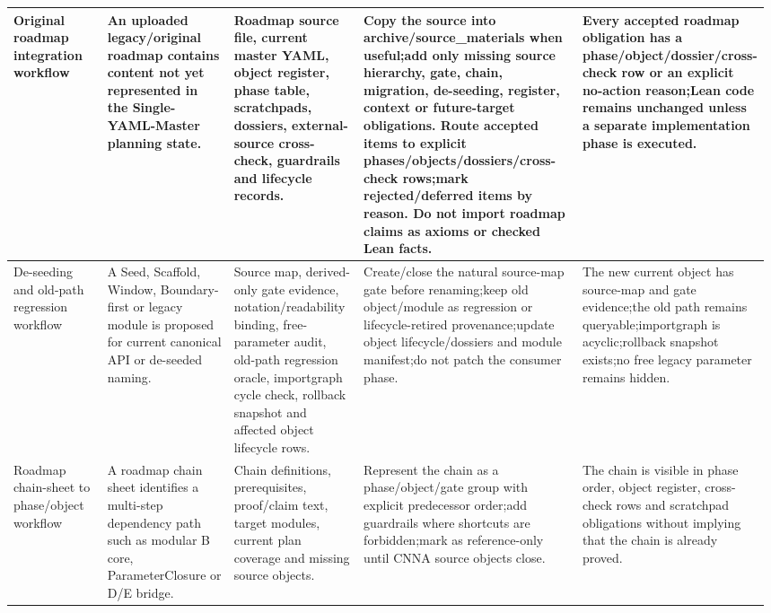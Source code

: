 \begin{longtable}{L{0.14\linewidth} L{0.19\linewidth} L{0.18\linewidth} L{0.31\linewidth} L{0.16\linewidth}}
Original roadmap integration workflow & An uploaded legacy/\allowbreak{}original roadmap contains content not yet represented in the Single-YAML-Master planning state. & Roadmap source file, current master YAML, object register, phase table, scratchpads, dossiers, external-source cross-check, guardrails and lifecycle records. & Copy the source into archive/\allowbreak{}source\_materials when useful;\newline add only missing source hierarchy, gate, chain, migration, de-seeding, register, context or future-target obligations. Route accepted items to explicit phases/\allowbreak{}objects/\allowbreak{}dossiers/\allowbreak{}cross-check rows;\newline mark rejected/\allowbreak{}deferred items by reason. Do not import roadmap claims as axioms or checked Lean facts. & Every accepted roadmap obligation has a phase/\allowbreak{}object/\allowbreak{}dossier/\allowbreak{}cross-check row or an explicit no-action reason;\newline Lean code remains unchanged unless a separate implementation phase is executed.\\
\hline
\addlinespace[0.24em]
De-seeding and old-path regression workflow & A Seed, Scaffold, Window, Boundary-first or legacy module is proposed for current canonical API or de-seeded naming. & Source map, derived-only gate evidence, notation/\allowbreak{}readability binding, free-parameter audit, old-path regression oracle, importgraph cycle check, rollback snapshot and affected object lifecycle rows. & Create/\allowbreak{}close the natural source-map gate before renaming;\newline keep old object/\allowbreak{}module as regression or lifecycle-retired provenance;\newline update object lifecycle/\allowbreak{}dossiers and module manifest;\newline do not patch the consumer phase. & The new current object has source-map and gate evidence;\newline the old path remains queryable;\newline importgraph is acyclic;\newline rollback snapshot exists;\newline no free legacy parameter remains hidden.\\
\hline
\addlinespace[0.24em]
Roadmap chain-sheet to phase/\allowbreak{}object workflow & A roadmap chain sheet identifies a multi-step dependency path such as modular B core, ParameterClosure or D/\allowbreak{}E bridge. & Chain definitions, prerequisites, proof/\allowbreak{}claim text, target modules, current plan coverage and missing source objects. & Represent the chain as a phase/\allowbreak{}object/\allowbreak{}gate group with explicit predecessor order;\newline add guardrails where shortcuts are forbidden;\newline mark as reference-only until CNNA source objects close. & The chain is visible in phase order, object register, cross-check rows and scratchpad obligations without implying that the chain is already proved.\\

\end{longtable}

